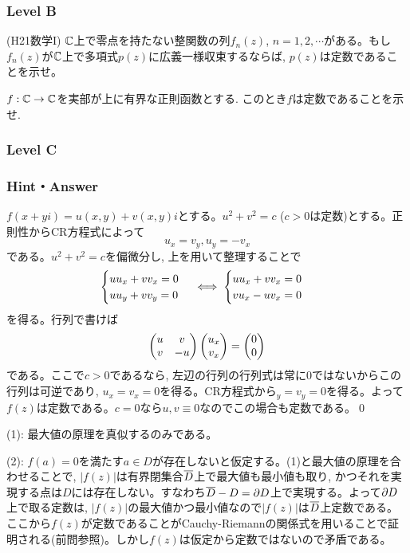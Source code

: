 \subsubsection{Level B}
\begin{prob} (H21数学I) \label{prob:H21I5}
$\mathbb{C}$上で零点を持たない整関数の列$f_n(z)$, $n=1,2,\cdots$がある。もし$f_n(z)$が$\mathbb{C}$上で多項式$p(z)$に広義一様収束するならば, $p(z)$は定数であることを示せ。
\end{prob}

\begin{prob}
$f:\mathbb{C}\to \mathbb{C}$を実部が上に有界な正則函数とする. このとき$f$は定数であることを示せ.
\end{prob}



\subsubsection{Level C}




\subsubsection{Hint・Answer}

\begin{probans}
$f(x+yi) = u(x,y) + v(x,y)i$とする。$u^2 + v^2 = c$ ($c>0$は定数)とする。正則性からCR方程式によって
\[u_x = v_y, u_y = -v_x\]
である。$u^2+v^2 = c$を偏微分し, 上を用いて整理することで
\[
\begin{cases}
uu_x + vv_x = 0\\
uu_y + vv_y = 0
\end{cases}
\iff
\begin{cases}
uu_x + vv_x = 0\\
vu_x - uv_x= 0
\end{cases}
\]
を得る。行列で書けば
\[
\begin{pmatrix}
u & v\\
v & -u
\end{pmatrix}
\begin{pmatrix}
u_x\\
v_x
\end{pmatrix}
=
\begin{pmatrix}
0\\
0
\end{pmatrix}
\]
である。ここで$c>0$であるなら, 左辺の行列の行列式は常に$0$ではないからこの行列は可逆であり, $u_x=v_x=0$を得る。CR方程式から$_y=v_y = 0$を得る。よって$f(z)$は定数である。$c=0$なら$u,v\equiv 0$なのでこの場合も定数である。\qed
\end{probans}


\begin{probans}
(1): 最大値の原理を真似するのみである。

(2): $f(a)=0$を満たす$a\in D$が存在しないと仮定する。(1)と最大値の原理を合わせることで, $|f(z)|$は有界閉集合$\overline{D}$上で最大値も最小値も取り, かつそれを実現する点は$D$には存在しない。すなわち$\overline{D}-D = \partial D$上で実現する。よって$\partial D$上で取る定数は, $|f(z)|$の最大値かつ最小値なので$|f(z)|$は$\overline{D}$上定数である。ここから$f(z)$が定数であることがCauchy-Riemannの関係式を用いることで証明される(前問参照)。しかし$f(z)$は仮定から定数ではないので矛盾である。
\end{probans}


